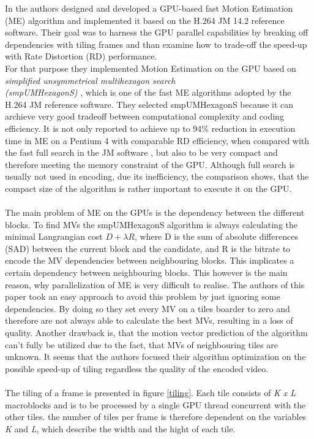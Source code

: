 In \cite{Paper1} the authors designed and developed a GPU-based fast Motion Estimation (ME) algorithm and implemented it based on the H.264 JM 14.2 reference software. Their goal was to harness the GPU parallel capabilities by breaking off dependencies with tiling frames and than examine how to trade-off the speed-up with Rate Distortion (RD) performance.\\
For that purpose they implemented Motion Estimation on the GPU based on \textit{simplified
unsymmetrical multihexagon search \\(smpUMHexagonS)} \cite{yi2005improved}, which is one of the fast ME algorithms adopted by the H.264 JM reference software. They selected smpUMHexagonS because it can archieve very good tradeoff between computational complexity and coding efficiency. It is not only reported to achieve up to 94\% reduction in execution time in ME on a Pentium 4 with comparable RD efficiency, when compared with the fast full search in the JM software \cite{yi2005improved}, but also to be very compact and therefore meeting the memory constraint of the GPU. Although full search is usually not used in encoding, due its inefficiency, the comparison shows, that the compact size of the algorithm is rather important to execute it on the GPU.\\
%
\\
The main problem of ME on the GPUs is the dependency between the different blocks. To find MVs the smpUMHexagonS algorithm is always calculating the minimal Langrangian cost $D + \lambda R$, where D is the sum of
absolute differences (SAD) between the current block and the candidate, and R is the bitrate
to encode the MV dependencies between neighbouring blocks. This implicates a certain dependency between neighbouring blocks. This however is the main reason, why parallelization of ME is very difficult to realise. The authors of this paper took an easy approach to avoid this problem by just ignoring some dependencies. By doing so they set every MV on a tiles boarder to zero and therefore are not always able to calculate the best MVs, resulting in a loss of quality. Another drawback is, that the motion vector prediction of the algorithm can't fully be utilized due to the fact, that MVs of neighbouring tiles are unknown. It seems that the authors focused their algorithm optimization on the possible speed-up of tiling regardless the quality of the encoded video.\\
\\
The tiling of a frame is presented in figure \ref{tiling}. Each tile consists of \textit{K x L} macroblocks and is to be processed by a single GPU thread concurrent with the other tiles. the number of tiles per frame is therefore dependent on the variables \textit{K} and \textit{L}, which describe the width and the hight of each tile.

